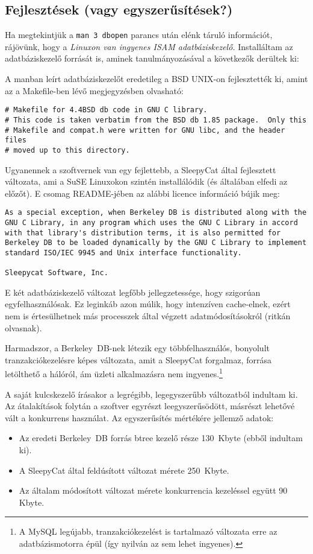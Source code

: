 \subsection{Fejlesztések (vagy egyszerűsítések?)}

Ha megtekintjük a \verb!man 3 dbopen! parancs után elénk táruló
információt, rájövünk, hogy a {\it Linuxon van ingyenes 
ISAM adatbáziskezelő.} Installáltam az adatbáziskezelő forrását is, 
aminek tanulmányozásával a következők derültek ki:

A manban leírt adatbáziskezelőt eredetileg a BSD UNIX-on fejlesztették 
ki, amint az a Makefile-ben lévő megjegyzésben olvasható:
\begin{verbatim}
# Makefile for 4.4BSD db code in GNU C library.
# This code is taken verbatim from the BSD db 1.85 package.  Only this
# Makefile and compat.h were written for GNU libc, and the header files
# moved up to this directory.
\end{verbatim}

Ugyanennek a szoftvernek van egy fejlettebb, a SleepyCat által
fejlesztett változata, ami a SuSE Linuxokon szintén
installálódik (és általában elfedi az előzőt). 
E csomag README-jében az alábbi licence információ bújik meg:
\begin{verbatim}
As a special exception, when Berkeley DB is distributed along with the
GNU C Library, in any program which uses the GNU C Library in accord
with that library's distribution terms, it is also permitted for
Berkeley DB to be loaded dynamically by the GNU C Library to implement
standard ISO/IEC 9945 and Unix interface functionality.

Sleepycat Software, Inc.
\end{verbatim}

E két adatbáziskezelő változat legfőbb jellegzetessége, 
hogy szigorúan egyfelhasználósak. Ez leginkáb azon múlik, 
hogy intenzíven cache-elnek, ezért nem is értesülhetnek más 
processzek által végzett adatmódosításokról (ritkán olvasnak).

Harmadszor, a Berkeley~DB-nek létezik egy többfelhasználós,
bonyolult tranzakciókezelésre képes változata, 
amit a SleepyCat forgalmaz, forrása letölthető a hálóról, 
ám üzleti alkalmazásra nem ingyenes.\footnote{
A MySQL legújabb, tranzakciókezelést is tartalmazó változata erre az 
adatbázismotorra épül (így nyilván az sem lehet ingyenes).} 

A saját kulcskezelő írásakor a legrégibb, legegyszerűbb változatból
indultam ki. Az átalakítások folytán a szoftver egyrészt leegyszerűsödött,
másrészt lehetővé vált a konkurrens használat. Az egyszerűsítés
mértékére jellemző adatok: 
\begin{itemize}
\item
  Az eredeti Berkeley~DB forrás btree kezelő része
  130~Kbyte (ebből indultam ki). 
\item
  A SleepyCat által feldúsított változat mérete 250~Kbyte. 
\item
  Az általam módosított változat mérete konkurrencia 
  kezeléssel együtt 90 Kbyte. 
\end{itemize}  

